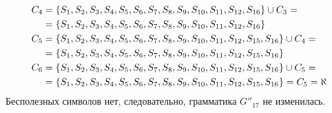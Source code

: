 \begin{enumerate}
\begin{itemize}
\begin{align*}
			            C_{4} & = \left\{S_1, S_2, S_3, S_4, S_5, S_6, S_7, S_8, S_9, S_{10}, S_{11}, S_{12}, S_{16}\right\} \cup C_{3} =                             \\
			                  & = \left\{S_1, S_2, S_3, S_4, S_5, S_6, S_7, S_8, S_9, S_{10}, S_{11}, S_{12}, S_{16}\right\}                                          \\
			            C_{5} & = \left\{S_1, S_2, S_3, S_4, S_5, S_6, S_7, S_8, S_9, S_{10}, S_{11}, S_{12}, S_{15}, S_{16}\right\} \cup C_{4} =                     \\
			                  & = \left\{S_1, S_2, S_3, S_4, S_5, S_6, S_7, S_8, S_9, S_{10}, S_{11}, S_{12}, S_{15}, S_{16}\right\}                                  \\
			            C_{6} & = \left\{S_1, S_2, S_3, S_4, S_5, S_6, S_7, S_8, S_9, S_{10}, S_{11}, S_{12}, S_{15}, S_{16}\right\} \cup C_{5} =                     \\
			                  & = \left\{S_1, S_2, S_3, S_4, S_5, S_6, S_7, S_8, S_9, S_{10}, S_{11}, S_{12}, S_{15}, S_{16}\right\} = C_5 = \aleph                   \\
		            \end{align*}
		            Бесполезных символов нет, следовательно, грамматика \(G''_{17}\) не изменилась.
	      \end{itemize}
\end{enumerate}
